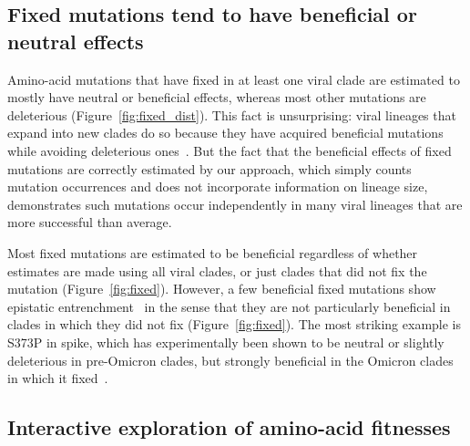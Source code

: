 \documentclass[9pt,twocolumn,twoside]{gsajnl_modified}
\begin{document}
\subsection*{Fixed mutations tend to have beneficial or neutral effects}
Amino-acid mutations that have fixed in at least one viral clade are estimated to mostly have neutral or beneficial effects, whereas most other mutations are deleterious (Figure~\ref{fig:fixed_dist}).
This fact is unsurprising: viral lineages that expand into new clades do so because they have acquired beneficial mutations while avoiding deleterious ones~\citep{luksza2014predictive, koelle2015effects, huddleston2020integrating}.
But the fact that the beneficial effects of fixed mutations are correctly estimated by our approach, which simply counts mutation occurrences and does not incorporate information on lineage size, demonstrates such mutations occur independently in many viral lineages that are more successful than average.

Most fixed mutations are estimated to be beneficial regardless of whether estimates are made using all viral clades, or just clades that did not fix the mutation (Figure~\ref{fig:fixed}).
However, a few beneficial fixed mutations show epistatic entrenchment~\citep{shah2015contingency, starr2018pervasive} in the sense that they are not particularly beneficial in clades in which they did not fix (Figure~\ref{fig:fixed}).
The most striking example is S373P in spike, which has experimentally been shown to be neutral or slightly deleterious in pre-Omicron clades, but strongly beneficial in the Omicron clades in which it fixed~\citep{starr2022deep, moulana2022compensatory}.

\subsection*{Interactive exploration of amino-acid fitnesses}
\end{document}
